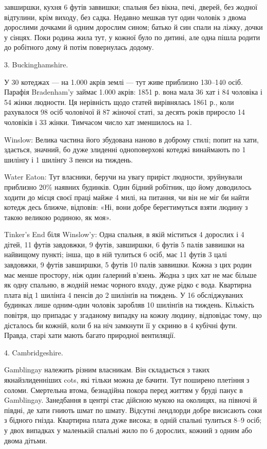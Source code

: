 \parcont{}  %
завширшки, кухня 6 футів заввишки; спальня без вікна, печі,
дверей, без жодної відтулини, крім виходу, без садка. Недавно
мешкав тут один чоловік з двома дорослими дочками й одним
дорослим сином; батько й син спали на ліжку, дочки у сінцях.
Поки родина жила тут, у кожної було по дитині, але одна пішла
родити до робітного дому й потім повернулась додому.

3. Buckinghamshire.

У 30 котеджах — на 1.000 акрів землі — тут живе приблизно
130--140 осіб. Парафія Bradenham’y займає 1.000 акрів: 1851 р.
вона мала 36 хат і 84 чоловіка і 54 жінки людности. Ця нерівність
щодо статей вирівнялась 1861 р., коли рахувалося 98 осіб
чоловічої й 87 жіночої статі, за десять років приросло 14 чоловіків
і 33 жінки. Тимчасом число хат зменшилось на 1.

Winslow: Велика частина його збудована наново в доброму
стилі; попит на хати, здається, значний, бо дуже злиденні одноповерхові
котеджі винаймають по 1 шилінґу і 1 шилінґу 3 пенси
на тиждень.

Water Eaton: Тут власники, беручи на увагу приріст людности,
зруйнували приблизно 20\% наявних будинків. Один бідний
робітник, що йому доводилось ходити до місця своєї праці
майже 4 милі, на питання, чи він не міг би найти котедж десь
ближче, відповів: «Ні, вони добре берегтимуться взяти людину
з  такою великою родиною, як моя».

Tinker’s End біля Winslow’y: Одна спальня, в якій міститься
4 дорослих і 4 дітей, 11 футів завдовжки, 9 футів, завширшки,
6 футів 5 палів заввишки на найвищому пункті; інша, що в ній
тулиться 6 осіб, має 11 футів 3 цалі завдовжки, 9 футів завширшки,
5 футів 10 палів заввишки. Кожна з цих родин має менше
простору, ніж один ґалерний в’язень. Жодна з цих хат не має
більше як одну спальню, в жодній немає чорного входу, дуже
рідко є вода. Квартирна плата від 1 шилінґа 4 пенсів до 2 шилінґів
на тиждень. У 16 обсліджуваних будинках лише одним-один
чоловік заробляв 10 шилінґів на тиждень. Кількість повітря, що
припадає у згаданому випадку на кожну людину, відповідає
тому, що дісталось би кожній, коли б на ніч замкнути її у скриню
в 4 кубічні фути. Правда, старі хати мають багато природної
вентиляції.

4. Cambridgeshire.

Gamblingay належить різним власникам. Він складається з
таких якнайзлиденніших cots, які тільки можна де бачити.
Тут поширено плетіння з соломи. Смертельна втома, безнадійна
покора перед життям у бруді панує в Gamblingay. Занедбання
в центрі стає дійсною мукою на околицях, на півночі й півдні, де
хати гниють шмат по шмату. Відсутні лендлорди добре висисають
соки з бідного гнізда. Квартирна плата дуже висока;
в одній спальні тулиться 8--9 осіб; у двох випадках у маленькій
спальні жило по 6 дорослих, кожний з одним або двома дітьми.
\parbreak{}  %
